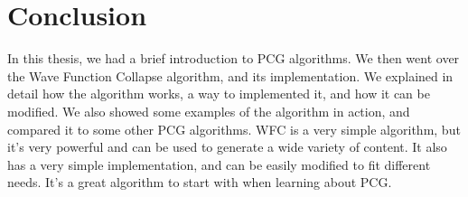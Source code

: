 \documentclass[10pt,oneside,a4paper]{article}
\begin{document}
\section{Conclusion}\label{sec:conclusion}
In this thesis, we had a brief introduction to PCG algorithms.
We then went over the Wave Function Collapse algorithm, and its implementation.
We explained in detail how the algorithm works, a way to implemented it, and how it can be modified.
We also showed some examples of the algorithm in action, and compared it to some other PCG algorithms.
WFC is a very simple algorithm, but it's very powerful and can be used to generate a wide variety of content.
It also has a very simple implementation, and can be easily modified to fit different needs.
It's a great algorithm to start with when learning about PCG\@.



\end{document}
